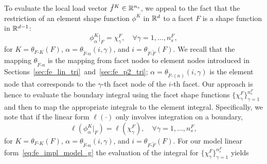 To evaluate the local load vector $\tilde f^K \in \mathbb{R}^{n_s}$, we appeal to the fact that the restriction of an element shape function $\phi^K$ in $\mathbb{R}^d$ to a facet $F$ is a shape function in $\mathbb{R}^{d-1}$:
\begin{equation*}
  \phi^K_{\alpha}|_{F} = \chi_\gamma^F, \quad \forall \gamma =1,\dots,n_s^F,
\end{equation*}
for  $K = \theta_{F\text{-}K}(F)$, $\alpha = \theta_{\tilde F\text{-}n}(i,\gamma)$, and $i = \theta_{F\text{-}\tilde F}(F)$.  We recall that the mapping $\theta_{\tilde F\text{-}n}$ is the mapping from facet nodes to element nodes introduced in  Sections~\ref{sec:fe_lin_tri}~and~\ref{sec:fe_p2_tri}; $\alpha = \theta_{\tilde F\text{-}(n)}(i,\gamma)$ is the element node that corresponds to the $\gamma$-th facet node of the $i$-th facet.  Our approach is hence to evaluate the boundary integral using the facet shape functions $\{\chi^F_\gamma\}_{\gamma =1}^{n_s^F}$ and then to map the appropriate integrals to the element integral.  Specifically, we note that if the linear form $\ell(\cdot)$ only involves integration on a boundary,
\begin{equation}
  \ell(\phi^{K}_{\alpha}|_F) = \ell(\chi_\gamma^{F}), \quad \forall \gamma = 1,\dots,n_s^F,
  \label{eq:fe_impl_chiK_to_phiK}
\end{equation}
for  $K = \theta_{F\text{-}K}(F)$, $\alpha = \theta_{\tilde F\text{-}n}(i,\gamma)$, and $i = \theta_{F\text{-}\tilde F}(F)$.  For our model linear form~\eqref{eq:fe_impl_model_g} the evaluation of the integral for $\{\chi_\gamma^F\}_{\gamma=1}^{n_s^F}$ yields
